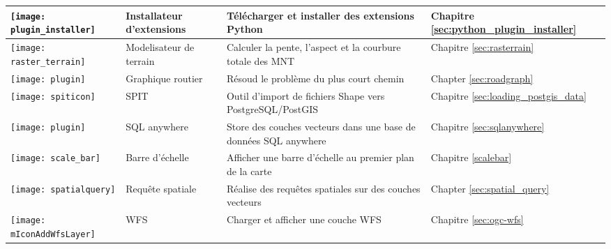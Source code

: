 {\begin{longtable}{|p{1cm}|p{4cm}|p{8cm}|p{3cm}|}
\hline
\texttt{[image: plugin\_installer]}
 & Installateur d'extensions \index{extensions!installation} & Télécharger et installer des extensions Python & Chapitre \ref{sec:python_plugin_installer}\\
\hline
\texttt{[image: raster\_terrain]}
 & Modelisateur de terrain \index{extensions!Raster Terrain Modelling} & Calculer la pente, l'aspect et la courbure totale des MNT & Chapitre \ref{sec:rasterrain}\\
\hline
\texttt{[image: plugin]}
 & Graphique routier \index{plugins!road graph} & Résoud le problème du plus court chemin & Chapter \ref{sec:roadgraph} \\
\hline
\texttt{[image: spiticon]}
 & SPIT \index{extensions!spit} & Outil d'import de fichiers Shape vers PostgreSQL/PostGIS & Chapitre \ref{sec:loading_postgis_data}\\
\hline
\texttt{[image: plugin]}
 & SQL anywhere \index{plugins!SQL anywhere} &  Store des couches vecteurs dans une base de données SQL anywhere & Chapitre \ref{sec:sqlanywhere} \\
\hline
\texttt{[image: scale\_bar]}
 & Barre d'échelle \index{extensions!barre d'échelle} & Afficher une barre d'échelle au premier plan de la carte & Chapitre \ref{scalebar}\\
\hline
\texttt{[image: spatialquery]}
 & Requête spatiale & Réalise des requêtes spatiales sur des couches vecteurs & Chapter \ref{sec:spatial_query} \\
\hline
\texttt{[image: mIconAddWfsLayer]}
 & WFS & Charger et afficher une couche WFS & Chapitre \ref{sec:ogc-wfs}\\
\hline
\end{longtable}}

